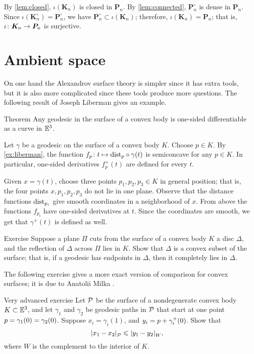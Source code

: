 By \ref{lem:closed}, $\iota(\bm{K}_n)$ is closed in $\bm{P}_n$.
By \ref{lem:connected}, $\bm{P}_n^\circ$ is dense in $\bm{P}_n$.
Since $\iota(\bm{K}_n^\circ)=\bm{P}_n^\circ$, we have $\bm{P}_n^\circ\subset \iota(\bm{K}_n)$;
therefore, $\iota(\bm{K}_n)=\bm{P}_n$;
that is, $\iota\colon\bm{K}_n\to\bm{P}_n$ is surjective.
\qeds

\section{Ambient space}

On one hand the Alexandrov surface theory is simpler since it has extra tools,
but it is also more complicated since these tools produce more questions.
The following result of Joseph Liberman \cite{liberman} gives an example.

\begin{thm}{Theorem}
Any geodesic in the surface of a convex body is one-sided differentiable as a curve in $\mathbb{E}^3$.
\end{thm}

Let $\gamma$ be a geodesic on the surface of a convex body $K$.
Choose $p\in K$.
By \ref{ex:liberman}, the function $f_p\colon t\mapsto \mathrm{dist}_p\circ\gamma(t)$ is semiconcave for any $p\in K$.
In particular, one-sided derivatives $f_p^+(t)$ are defined for every $t$.

Given $x=\gamma(t)$, choose three points $p_1,p_2,p_3\in K$ in general position;
that is, the four points $x,p_1,p_2,p_3$ do not lie in one plane.
Observe that the distance functions $\mathrm{dist}_{p_i}$ give smooth coordinates in a neighborhood of $x$.
From above the functions $f_{p_i}$ have one-sided derivatives at $t$.
Since the coordinates are smooth, we get that $\gamma^+(t)$ is defined as well.
\qeds




\begin{thm}{Exercise}\label{ex:convex}
Suppose a plane $\Pi$ cuts from the surface of a convex body $K$ a disc $\Delta$, and the reflection of $\Delta$ across $\Pi$ lies in $K$.
Show that $\Delta$ is a convex subset of the surface;
that is, if a geodesic has endpoints in $\Delta$, then it completely lies in $\Delta$.
\end{thm}

The following exercise gives a more exact version of comparison for convex surfaces;
it is due to Anatolii Milka \cite[Theorem 2]{milka1982}.

\begin{thm}{Very advanced exercise}\label{ex:milka}
Let $\mathcal{P}$ be the surface of a nondegenerate convex body $K\subset\mathbb{E}^3$,
and let $\gamma_1$ and $\gamma_2$ be geodesic paths in $\mathcal{P}$ that start at one point $p=\gamma_1(0)=\gamma_2(0)$.
Suppose $x_i=\gamma_i(1)$, and $y_i=p+\gamma_i^+(0)$.
Show that
\[|{x_1}-{x_2}|_{\mathcal{P}}^{{}}\leqslant |{y_1}-{y_2}|_{W}^{{}},\]
where $W$ is the complement to the interior of $K$.

\end{thm}



